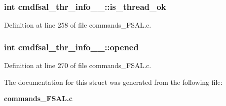 \subsubsection[{is\_\-thread\_\-ok}]{\setlength{\rightskip}{0pt plus 5cm}int {\bf cmdfsal\_\-thr\_\-info\_\-\_\-::is\_\-thread\_\-ok}}\label{structcmdfsal__thr__info_____a7e4c866d22d03872cb0905d73d41dbb6}


Definition at line 258 of file commands\_\-FSAL.c.
\subsubsection[{opened}]{\setlength{\rightskip}{0pt plus 5cm}int {\bf cmdfsal\_\-thr\_\-info\_\-\_\-::opened}}\label{structcmdfsal__thr__info_____aa3532ab85e3b4baab2ba7b386c4d08d0}


Definition at line 270 of file commands\_\-FSAL.c.

The documentation for this struct was generated from the following file:\begin{DoxyCompactItemize}
\item 
{\bf commands\_\-FSAL.c}\end{DoxyCompactItemize}
